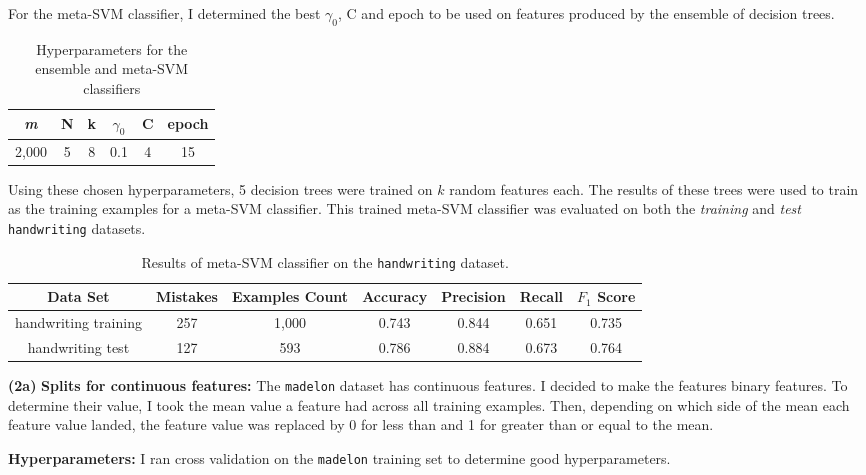 \documentclass[11pt]{article}
\renewcommand\part[1]{\vspace{.10in}\textbf{(#1)}}
\begin{document}
	For the meta-SVM classifier, I determined the best $\gamma_0$, C and epoch to be used on features produced by the ensemble of decision trees.
	
\begin{table}[H]
\centering
{\renewcommand{\arraystretch}{1.2}%
\begin{tabular}{| c | c | c | c | c | c |}
\hline
\textit{m} & N & k & $\gamma_0$ & C & epoch\\
\hline
2,000 & 5 & 8 & 0.1 & 4 & 15\\ \hline
\end{tabular}}
\caption{Hyperparameters for the ensemble and meta-SVM classifiers}
\end{table}

Using these chosen hyperparameters, 5 decision trees were trained on $\textit{k}$ random features each. The results of these trees were used to train as the training examples for a meta-SVM classifier. This trained meta-SVM classifier was evaluated on both the \textit{training} and \textit{test} {\tt handwriting} datasets.

 \begin{table}[H]
\centering
{\renewcommand{\arraystretch}{1.2}%
\begin{tabular}{| c | c | c | c | c | c | c |}
\hline
Data Set & Mistakes & Examples Count & Accuracy & Precision & Recall & $F_1$ Score\\
\hline
handwriting training & 257 & 1,000 & 0.743 & 0.844 & 0.651 & 0.735\\ \hline
handwriting test & 127 & 593 & 0.786 & 0.884 & 0.673 & 0.764\\ \hline
\end{tabular}}
\caption{Results of meta-SVM classifier on the {\tt handwriting} dataset.}
\end{table}

\part{2a} \textbf{Splits for continuous features:} The {\tt madelon} dataset has continuous features. I decided to make the features binary features. To determine their value, I took the mean value a feature had across all training examples. Then, depending on which side of the mean each feature value landed, the feature value was replaced by 0 for less than and 1 for greater than or equal to the mean.

\textbf{Hyperparameters:} I ran cross validation on the {\tt madelon} training set to determine good hyperparameters.
\end{document}
